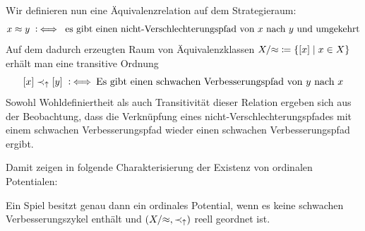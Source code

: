 Wir definieren nun eine Äquivalenzrelation auf dem Strategieraum:
	\[x \approx y \mathbin{~\mathop:\!\!\iff} \text{ es gibt einen nicht-Verschlechterungspfad von $x$ nach $y$ und umgekehrt}\]
Auf dem dadurch erzeugten Raum von Äquivalenzklassen $X/{\approx} \coloneqq \left\lbrace[x] \mid x \in X\right\rbrace$ erhält man eine transitive Ordnung
	\[[x] \prec_\uparrow [y] \mathbin{~\mathop:\!\!\iff} \text{Es gibt einen schwachen Verbesserungspfad von $y$ nach $x$}\]
Sowohl Wohldefiniertheit als auch Transitivität dieser Relation ergeben sich aus der Beobachtung, dass die Verknüpfung eines nicht-Verschlechterungspfades mit einem schwachen Verbesserungspfad wieder einen schwachen Verbesserungspfad ergibt.

Damit zeigen \citeauthor{CharExOrdPot} in \cite[Theorem 3.1]{CharExOrdPot} folgende Charakterisierung der Existenz von ordinalen Potentialen:

\begin{satz}\label{satz:CharOrdPot}
	Ein Spiel besitzt genau dann ein ordinales Potential, wenn es keine schwachen Verbesserungszykel enthält und $(X/{\approx}, \prec_\uparrow)$ reell geordnet ist.
\end{satz}

